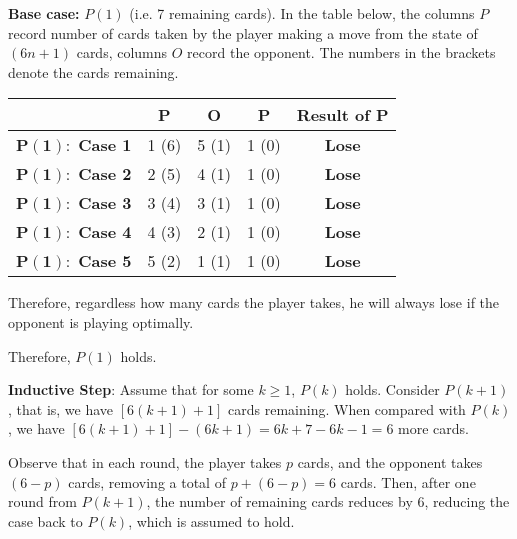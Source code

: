 \documentclass[answers]{exam}
\begin{document}
\begin{questions}
\begin{parts}
\begin{solution}
\begin{psol}
                \textbf{Base case:} $P(1)$ (i.e. 7 remaining cards).
                In the table below, the columns $P$ record number of cards taken by the player
                making a move from the state of $(6n+1)$ cards, columns $O$ record the opponent.
                The numbers in the brackets denote the cards remaining.
                \begin{center}
                    \begin{tabular}{|c||c|c|c||c|}
                        \hline
                                                        & \textbf{P}    & \textbf{O}    & \textbf{P}    & \textbf{Result of P} \\
                        \hline
                        $\bm{P(1):}$ \textbf{Case 1}    & 1 (6)         & 5 (1)         & 1 (0)         & \textbf{Lose} \\
                        $\bm{P(1):}$ \textbf{Case 2}    & 2 (5)         & 4 (1)         & 1 (0)         & \textbf{Lose} \\
                        $\bm{P(1):}$ \textbf{Case 3}    & 3 (4)         & 3 (1)         & 1 (0)         & \textbf{Lose} \\
                        $\bm{P(1):}$ \textbf{Case 4}    & 4 (3)         & 2 (1)         & 1 (0)         & \textbf{Lose} \\
                        $\bm{P(1):}$ \textbf{Case 5}    & 5 (2)         & 1 (1)         & 1 (0)         & \textbf{Lose} \\
                        \hline
                    \end{tabular}
                \end{center}
                Therefore, regardless how many cards the player takes, he will always lose if the
                opponent is playing optimally.

                Therefore, $P(1)$ holds.

                \textbf{Inductive Step}: Assume that for some $k\geq1$, $P(k)$ holds. Consider
                $P(k+1)$, that is, we have $[6(k+1)+1]$ cards remaining. When compared with
                $P(k)$, we have $[6(k+1)+1]-(6k+1)=6k+7-6k-1=6$ more cards.

                Observe that in each round, the player takes $p$ cards, and the opponent takes
                $(6-p)$ cards, removing a total of $p+(6-p)=6$ cards. Then, after one round from
                $P(k+1)$, the number of remaining cards reduces by 6, reducing the case back to
                $P(k)$, which is assumed to hold.


\end{psol}
\end{solution}
\end{parts}
\end{questions}
\end{document}
